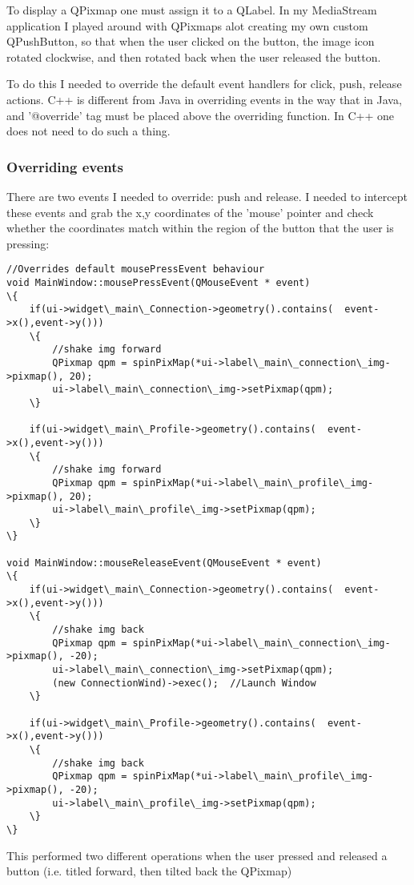 To display a QPixmap one must assign it to a QLabel. In my MediaStream application I played around with QPixmaps alot creating my own custom QPushButton, so that when the user clicked on the button, the image icon rotated clockwise, and then rotated back when the user released the button.

To do this I needed to override the default event handlers for click, push, release actions. C++ is different from Java in overriding events in the way that in Java, and '@override' tag must be placed above the overriding function. In C++ one does not need to do such a thing.
\subsubsection{Overriding events}
There are two events I needed to override: push and release. I needed to intercept these events and grab the x,y coordinates of the 'mouse' pointer and check whether the  coordinates match within the region of the button that the user is pressing:
\begin{lstlisting}
//Overrides default mousePressEvent behaviour
void MainWindow::mousePressEvent(QMouseEvent * event)
\{
    if(ui->widget\_main\_Connection->geometry().contains(  event->x(),event->y()))
    \{
        //shake img forward
        QPixmap qpm = spinPixMap(*ui->label\_main\_connection\_img->pixmap(), 20);
        ui->label\_main\_connection\_img->setPixmap(qpm);
    \}

    if(ui->widget\_main\_Profile->geometry().contains(  event->x(),event->y()))
    \{
        //shake img forward
        QPixmap qpm = spinPixMap(*ui->label\_main\_profile\_img->pixmap(), 20);
        ui->label\_main\_profile\_img->setPixmap(qpm);
    \}
\}

void MainWindow::mouseReleaseEvent(QMouseEvent * event)
\{
    if(ui->widget\_main\_Connection->geometry().contains(  event->x(),event->y()))
    \{
        //shake img back
        QPixmap qpm = spinPixMap(*ui->label\_main\_connection\_img->pixmap(), -20);
        ui->label\_main\_connection\_img->setPixmap(qpm);
        (new ConnectionWind)->exec();  //Launch Window
    \}

    if(ui->widget\_main\_Profile->geometry().contains(  event->x(),event->y()))
    \{
        //shake img back
        QPixmap qpm = spinPixMap(*ui->label\_main\_profile\_img->pixmap(), -20);
        ui->label\_main\_profile\_img->setPixmap(qpm);
    \}
\}
\end{lstlisting}
This performed two different operations when the user pressed and released a button (i.e. titled forward, then tilted back the QPixmap)

